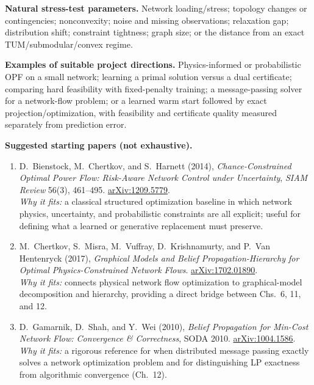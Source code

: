 \documentclass[11pt]{article}
\begin{document}
\textbf{Natural stress-test parameters.} Network loading/stress; topology changes or contingencies; nonconvexity; noise and missing observations; relaxation gap; distribution shift; constraint tightness; graph size; or the distance from an exact TUM/submodular/convex regime.

\textbf{Examples of suitable project directions.} Physics-informed or probabilistic OPF on a small network; learning a primal solution versus a dual certificate; comparing hard feasibility with fixed-penalty training; a message-passing solver for a network-flow problem; or a learned warm start followed by exact projection/optimization, with feasibility and certificate quality measured separately from prediction error.

\textbf{Suggested starting papers (not exhaustive).}
\begin{enumerate}[leftmargin=1.7em,itemsep=5pt]
    \item D.~Bienstock, M.~Chertkov, and S.~Harnett (2014), \emph{Chance-Constrained Optimal Power Flow: Risk-Aware Network Control under Uncertainty}, \emph{SIAM Review} 56(3), 461--495. \href{https://arxiv.org/abs/1209.5779}{arXiv:1209.5779}.\\
    \textcolor{UAgray}{\emph{Why it fits:} a classical structured optimization baseline in which network physics, uncertainty, and probabilistic constraints are all explicit; useful for defining what a learned or generative replacement must preserve.}

    \item M.~Chertkov, S.~Misra, M.~Vuffray, D.~Krishnamurty, and P.~Van Hentenryck (2017), \emph{Graphical Models and Belief Propagation-Hierarchy for Optimal Physics-Constrained Network Flows}. \href{https://arxiv.org/abs/1702.01890}{arXiv:1702.01890}.\\
    \textcolor{UAgray}{\emph{Why it fits:} connects physical network flow optimization to graphical-model decomposition and hierarchy, providing a direct bridge between Chs.~6, 11, and 12.}

    \item D.~Gamarnik, D.~Shah, and Y.~Wei (2010), \emph{Belief Propagation for Min-Cost Network Flow: Convergence \& Correctness}, SODA 2010. \href{https://arxiv.org/abs/1004.1586}{arXiv:1004.1586}.\\
    \textcolor{UAgray}{\emph{Why it fits:} a rigorous reference for when distributed message passing exactly solves a network optimization problem and for distinguishing LP exactness from algorithmic convergence (Ch.~12).}


\end{enumerate}
\end{document}
